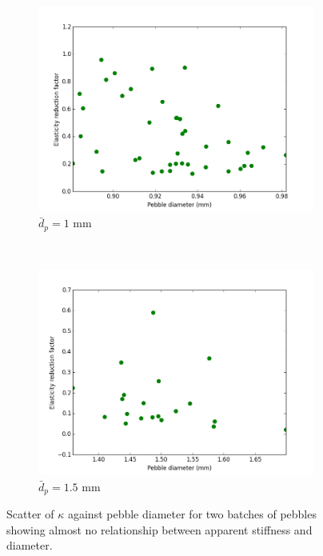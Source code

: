 \begin{figure}
        \centering
        \begin{subfigure}[b]{\imagewidth}
                \includegraphics[width=\textwidth]{chapters/figures/nfri-1mm-kappa-dp-scatter.png}
                \caption{$\bar{d}_p = 1$ mm}
                \label{fig:nfri-1mm-kappa-dp-scatter}
        \end{subfigure}
        ~
        \begin{subfigure}[b]{\imagewidth}
                \includegraphics[width=\textwidth]{chapters/figures/nfri-1.5mm-kappa-dp-scatter.png}
                \caption{$\bar{d}_p = 1.5$ mm}
                \label{fig:nfri-1.5mm-kappa-dp-scatter}
        \end{subfigure}
        \caption{Scatter of $\kappa$ against pebble diameter for two batches of \lit pebbles showing almost no relationship between apparent stiffness and diameter.}\label{fig:nfri-kappa-dp-scatter}
\end{figure}







